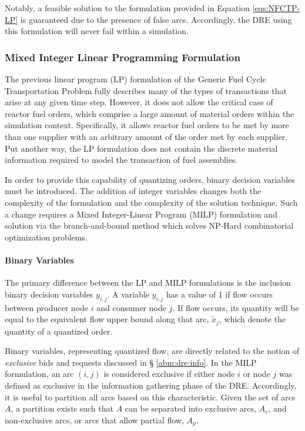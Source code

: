 Notably, a feasible solution to the formulation provided in Equation
\ref{eqs:NFCTP-LP} is guaranteed due to the presence of false arcs. Accordingly,
the DRE using this formulation will never fail within a simulation.

\subsubsection{Mixed Integer Linear Programming Formulation}\label{abm:dre:milp}

The previous linear program (LP) formulation of the Generic Fuel Cycle
Transportation Problem fully describes many of the types of transactions that
arise at any given time step. However, it does not allow the critical case of
reactor fuel orders, which comprise a large amount of material orders within the
simulation context. Specifically, it allows reactor fuel orders to be met by
more than one supplier with an arbitrary amount of the order met by each
supplier. Put another way, the LP formulation does not contain the discrete
material information required to model the transaction of fuel assemblies. 

In order to provide this capability of quantizing orders, binary decision
variables must be introduced. The addition of integer variables changes both the
complexity of the formulation and the complexity of the solution technique. Such
a change requires a Mixed Integer-Linear Program (MILP) formulation and solution
via the branch-and-bound method which solves NP-Hard combinatorial optimization
problems.

\paragraph{Binary Variables}

The primary difference between the LP and MILP formulations is the inclusion
binary decision variables $y_{i,j}$. A variable $y_{i,j}$ has a value of 1 if
flow occurs between producer node $i$ and consumer node $j$. If flow occurs, its
quantity will be equal to the equivalent flow upper bound along that arc,
$\tilde{x}_{j}$, which denote the quantity of a quantized order.

Binary variables, representing quantized flow, are directly related to the
notion of \textit{exclusive} bids and requests discussed in \S
\ref{abm:dre:info}. In the MILP formulation, an arc $(i, j)$ is considered
exclusive if either node $i$ or node $j$ was defined as exclusive in the
information gathering phase of the DRE. Accordingly, it is useful to partition
all arcs based on this characteristic. Given the set of arcs $A$, a partition
exists such that $A$ can be separated into exclusive arcs, $A_e$, and
non-exclusive arcs, or arcs that allow partial flow, $A_p$.

